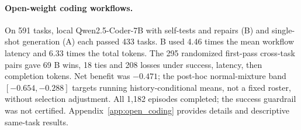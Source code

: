 \paragraph{Open-weight coding workflows.}
On 591 tasks, local Qwen2.5-Coder-7B with self-tests and repairs (B) and
single-shot generation (A) each passed 433 tasks. B used 4.46 times the
mean workflow latency and 6.33 times the total tokens. The 295 randomized
first-pass cross-task pairs gave 69 B wins, 18 ties and 208 losses under
success, latency, then completion tokens. Net benefit was $-0.471$;
the post-hoc normal-mixture band $[-0.654,-0.288]$ targets running
history-conditional means, not a fixed roster, without selection adjustment.
All 1,182 episodes completed; the success guardrail was not certified.
Appendix~\ref{app:open_coding} provides details and descriptive same-task results.

